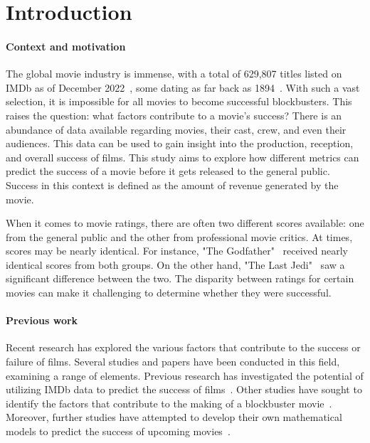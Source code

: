 \section{Introduction}
    \paragraph{Context and motivation}
        The global movie industry is immense, with a total of 629,807 titles listed on
            IMDb as of December 2022~\cite{imdbStats}, some dating as far back as
            1894~\cite{imdbOldest}.
        With such a vast selection, it is impossible for all movies to become
            successful blockbusters.
        This raises the question: what factors contribute to a movie's success?
        There is an abundance of data available regarding movies, their cast, crew, and
            even their audiences.
        This data can be used to gain insight into the production, reception, and
            overall success of films.
        This study aims to explore how different metrics can predict the success of a
            movie before it gets released to the general public.
        Success in this context is defined as the amount of revenue generated by the
            movie.

        When it comes to movie ratings, there are often two different scores available:
            one from the general public and the other from professional movie critics.
        At times, scores may be nearly identical.
        For instance, "The Godfather"~\cite{rottenTomatoesGodfather} received nearly
            identical scores from both groups.
        On the other hand, "The Last Jedi"~\cite{rottenTomatoesLastJedi} saw a
            significant difference between the two.
        The disparity between ratings for certain movies can make it challenging to
            determine whether they were successful.

    \paragraph{Previous work}
        Recent research has explored the various factors that contribute to the success
            or failure of films.
        Several studies and papers have been conducted in this field, examining a range
            of elements.
        Previous research has investigated the potential of utilizing IMDb data to
            predict the success of films~\cite{dhirRaj}.
        Other studies have sought to identify the factors that contribute to the making
            of a blockbuster movie~\cite{collinsHandSnell}.
        Moreover, further studies have attempted to develop their own mathematical
            models to predict the success of upcoming
            movies~\cite{ahmadDuraisamyYousefBuckles}.

